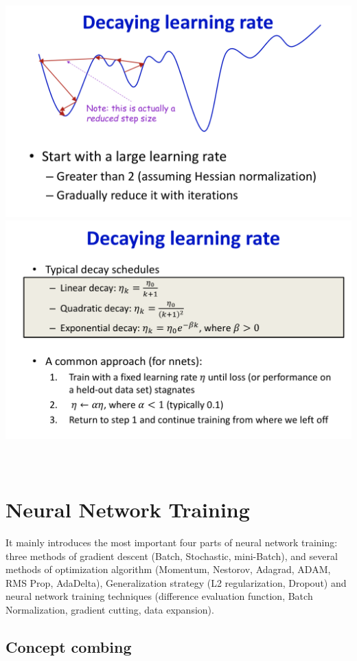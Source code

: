 \documentclass{article}
\begin{document}
	\includegraphics[scale=0.2]{80.png}
	\includegraphics[scale=0.2]{81.png} \\ \\ \\
	
	
	\section{Neural Network Training}
	
	It mainly introduces the most important four parts of neural network training: three methods of gradient descent (Batch, Stochastic, mini-Batch), and several methods of optimization algorithm (Momentum, Nestorov, Adagrad, ADAM, RMS Prop, AdaDelta), Generalization strategy (L2 regularization, Dropout) and neural network training techniques (difference evaluation function, Batch Normalization, gradient cutting, data expansion).
	
	
	\subsection{Concept combing}
	
\end{document}
